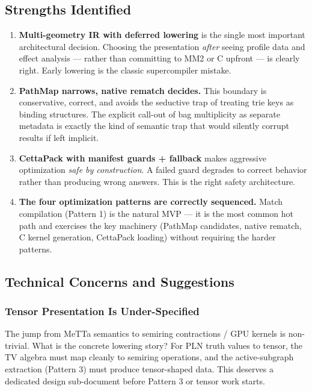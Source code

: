 \documentclass[11pt]{article}
\begin{document}
\subsection{Strengths Identified}

\begin{enumerate}
    \item \textbf{Multi-geometry IR with deferred lowering} is the single most important architectural decision. Choosing the presentation \textit{after} seeing profile data and effect analysis --- rather than committing to MM2 or C upfront --- is clearly right. Early lowering is the classic supercompiler mistake.

    \item \textbf{PathMap narrows, native rematch decides.} This boundary is conservative, correct, and avoids the seductive trap of treating trie keys as binding structures. The explicit call-out of bag multiplicity as separate metadata is exactly the kind of semantic trap that would silently corrupt results if left implicit.

    \item \textbf{CettaPack with manifest guards + fallback} makes aggressive optimization \textit{safe by construction}. A failed guard degrades to correct behavior rather than producing wrong answers. This is the right safety architecture.

    \item \textbf{The four optimization patterns are correctly sequenced.} Match compilation (Pattern 1) is the natural MVP --- it is the most common hot path and exercises the key machinery (PathMap candidates, native rematch, C kernel generation, CettaPack loading) without requiring the harder patterns.
\end{enumerate}

\subsection{Technical Concerns and Suggestions}

\subsubsection{Tensor Presentation Is Under-Specified}

The jump from MeTTa semantics to semiring contractions / GPU kernels is non-trivial. What is the concrete lowering story? For PLN truth values to tensor, the TV algebra must map cleanly to semiring operations, and the active-subgraph extraction (Pattern 3) must produce tensor-shaped data. This deserves a dedicated design sub-document before Pattern 3 or tensor work starts.
\end{document}
